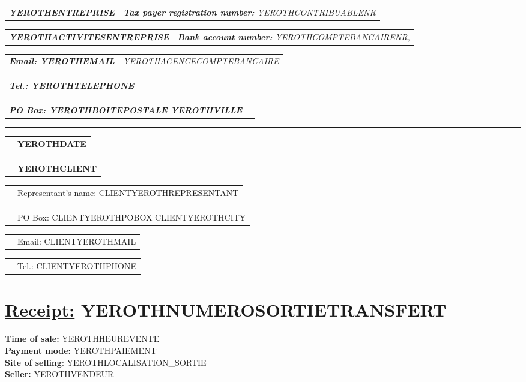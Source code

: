 \documentclass[10pt,YEROTHPAPERSPEC]{article} %
\makeatletter
\newcommand{\headerrow}[2]
{\begin{tabular*}{\linewidth}{l@{\extracolsep{\fill}}r}
	#1 &
	#2 \\
\end{tabular*}}
\newcommand{\emphbold}[1]{\textbf{\emph{#1}}\xspace}
\makeatother
\begin{document}
\bigskip

\headerrow
	{\emphbold{YEROTHENTREPRISE}}
	{\emph{\textbf{Tax payer registration number:} YEROTHCONTRIBUABLENR}}
\headerrow
	{\emphbold{YEROTHACTIVITESENTREPRISE}}
	{\emph{\textbf{Bank account number:} YEROTHCOMPTEBANCAIRENR,}}
\headerrow
	{\emphbold{Email: YEROTHEMAIL}}
	{\emph{YEROTHAGENCECOMPTEBANCAIRE}}
\headerrow
	{\emphbold{Tel.: YEROTHTELEPHONE}}
	{}
\headerrow
	{\emphbold{PO Box: YEROTHBOITEPOSTALE YEROTHVILLE}}
	{}
	
\hrule

\headerrow
	{}
	{\textbf{YEROTHDATE}}

\vspace*{0.9cm}

\headerrow
{}
{\textbf{YEROTHCLIENT}}
\headerrow
{}
{Representant's name: CLIENTYEROTHREPRESENTANT}
\headerrow
{}
{PO Box: CLIENTYEROTHPOBOX CLIENTYEROTHCITY}
\headerrow
{}
{Email: CLIENTYEROTHMAIL}
\headerrow
{}
{Tel.: CLIENTYEROTHPHONE}

\section*{\underline{Receipt:} YEROTHNUMEROSORTIETRANSFERT}
\textbf{Time of sale:} YEROTHHEUREVENTE\\
\textbf{Payment mode:} YEROTHPAIEMENT\\
\textbf{Site of selling}: YEROTHLOCALISATION_SORTIE\\
\textbf{Seller:} YEROTHVENDEUR

\vspace{0.3cm} 
\end{document}
